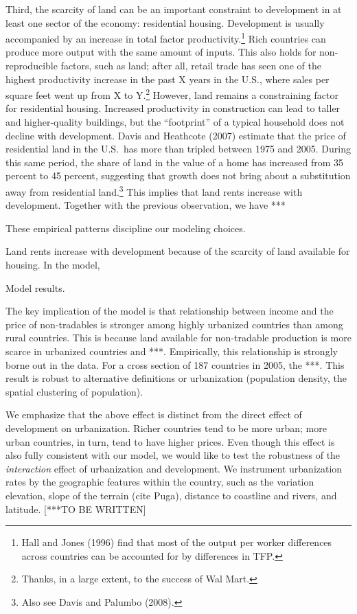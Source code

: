 \documentclass[12pt]{article}
\begin{document}
Third, the scarcity of land can be an important constraint to development in at least one sector of the economy: residential housing. Development is usually accompanied by an increase in total factor productivity.\footnote{Hall and Jones (1996) find that most of the output per worker differences across countries can be accounted for by differences in TFP.} Rich countries can produce more output with the same amount of inputs. This also holds for non-reproducible factors, such as land; after all, retail trade has seen one of the highest productivity increase in the past X years in the U.S., where sales per square feet went up from X to Y.\footnote{Thanks, in a large extent, to the success of Wal Mart.} However, land remains a constraining factor for residential housing. Increased productivity in construction can lead to taller and higher-quality buildings, but the ``footprint'' of a typical household does not decline with development. Davis and Heathcote (2007) estimate that the price of residential land in the U.S.~has more than tripled between 1975 and 2005. During this same period, the share of land in the value of a home has increased from 35 percent to 45 percent, suggesting that growth does not bring about a substitution away from residential land.\footnote{Also see Davis and Palumbo (2008).} This implies that land rents increase with development. Together with the previous observation, we have ***

These empirical patterns discipline our modeling choices.  

Land rents increase with development because of the scarcity of land available for housing. In the model,

Model results.

The key implication of the model is that relationship between income and the price of non-tradables is stronger among highly urbanized countries than among rural countries. This is because land available for non-tradable production is more scarce in urbanized countries and ***. Empirically, this relationship is strongly borne out in the data. For a cross section of 187 countries in 2005, the ***. This result is robust to alternative definitions or urbanization (population density, the spatial clustering of population).

We emphasize that the above effect is distinct from the direct effect of development on urbanization. Richer countries tend to be more urban; more urban countries, in turn, tend to have higher prices. Even though this effect is also fully consistent with our model, we would like to test the robustness of the \emph{interaction} effect of urbanization and development. We instrument urbanization rates by the geographic features within the country, such as the variation elevation, slope of the terrain (cite Puga), distance to coastline and rivers, and latitude. [***TO BE WRITTEN]
\end{document}
